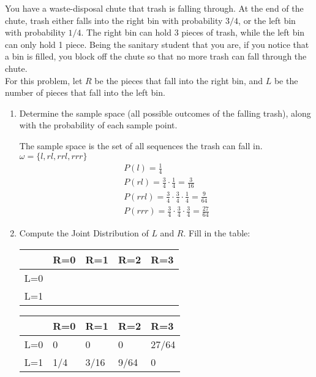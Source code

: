  \question You have a waste-disposal chute that trash is falling through. At the end of the chute, trash either falls into the right bin with probability $3/4$, or the left bin with probability $1/4$. The right bin can hold 3 pieces of trash, while the left bin can only hold 1 piece. Being the sanitary student that you are, if you notice that a bin is filled, you block off the chute so that no more trash can fall through the chute.
\\
For this problem, let $R$ be the pieces that fall into the right bin, and $L$ be the number of pieces that fall into the left bin.
\begin{enumerate}
\item Determine the sample space (all possible outcomes of the falling trash), along with the probability of each sample point.
\begin{solution}[.75 cm]
The sample space is the set of all sequences the trash can fall in. $\omega = \{l, rl, rrl, rrr\}$
\begin{gather*}
    P(l) = \frac{1}{4}\\
    P(rl) = \frac{3}{4}\cdot\frac{1}{4} = \frac{3}{16}\\
    P(rrl) = \frac{3}{4}\cdot\frac{3}{4}\cdot\frac{1}{4} = \frac{9}{64}\\
    P(rrr) = \frac{3}{4}\cdot\frac{3}{4}\cdot\frac{3}{4}=\frac{27}{64}
\end{gather*}
\end{solution}

\item Compute the Joint Distribution of $L$ and $R$. Fill in the table:
\begin{center}
\begin{tabular}{|l|l|l|l|l|}
\hline
    & R=0 & R=1 & R=2 & R=3 \\ \hline
L=0 &     &     &     &     \\ \hline
L=1 &     &     &     &     \\ \hline
\end{tabular}
\end{center}
\begin{solution}[.75 cm]
\begin{center}
\begin{tabular}{|l|l|l|l|l|}
\hline
    & R=0 & R=1 & R=2 & R=3 \\ \hline
L=0 &0     &   0  & 0    &  27/64   \\ \hline
L=1 &   1/4  &  3/16   &   9/64  &    0 \\ \hline
\end{tabular}
\end{center}
\end{solution}


\end{enumerate}

